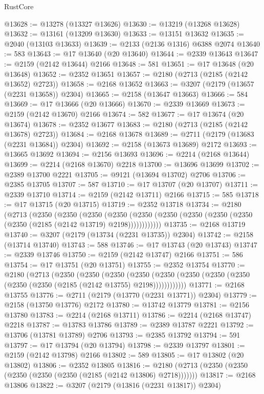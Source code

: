 \begin{lexlean}{RustCore}
\begin{coremodule}
@13628 := @13278 (@13327 @13626)
@13630 := @13219 (@13268 @13628)
@13632 := @13161 (@13209 @13630)
@13633 := @13151 @13632
@13635 := @2040 (@13103 @13633)
@13639 := @2133 (@2136 @1316) @6388 @2074
@13640 := 583
@13643 := @17 @13640 (@20 @13640)
@13644 := @2339 @13643
@13647 := @2159 (@2142 @13644) @2166
@13648 := 581
@13651 := @17 @13648 (@20 @13648)
@13652 := @2352 @13651
@13657 := @2180 (@2713 (@2185 (@2142 @13652) @2723))
@13658 := @2168 @13652
@13663 := @3207 (@2179 (@13657 (@2231 @13658)) @2304)
@13665 := @2158 (@13647 @13663)
@13666 := 584
@13669 := @17 @13666 (@20 @13666)
@13670 := @2339 @13669
@13673 := @2159 (@2142 @13670) @2166
@13674 := 582
@13677 := @17 @13674 (@20 @13674)
@13678 := @2352 @13677
@13683 := @2180 (@2713 (@2185 (@2142 @13678) @2723))
@13684 := @2168 @13678
@13689 := @2711 (@2179 (@13683 (@2231 @13684)) @2304)
@13692 := @2158 (@13673 @13689) @2172
@13693 := @13665 @13692
@13694 := @2156 @13693
@13696 := @2214 (@2168 @13644)
@13699 := @2214 (@2168 @13670) @2218
@13700 := @13696 @13699
@13702 := @2389 @13700 @2221
@13705 := @9121 (@13694 @13702) @2706
@13706 := @2385 @13705
@13707 := 587
@13710 := @17 @13707 (@20 @13707)
@13711 := @2339 @13710
@13714 := @2159 (@2142 @13711) @2166
@13715 := 585
@13718 := @17 @13715 (@20 @13715)
@13719 := @2352 @13718
@13734 := @2180
    (@2713
      (@2350
        (@2350
          (@2350
            (@2350 (@2350 (@2350 (@2350 (@2350 (@2350 (@2350 (@2185 (@2142 @13719) @2198))))))))))))
@13735 := @2168 @13719
@13740 := @3207 (@2179 (@13734 (@2231 @13735)) @2304)
@13742 := @2158 (@13714 @13740)
@13743 := 588
@13746 := @17 @13743 (@20 @13743)
@13747 := @2339 @13746
@13750 := @2159 (@2142 @13747) @2166
@13751 := 586
@13754 := @17 @13751 (@20 @13751)
@13755 := @2352 @13754
@13770 := @2180
    (@2713
      (@2350
        (@2350
          (@2350
            (@2350 (@2350 (@2350 (@2350 (@2350 (@2350 (@2350 (@2185 (@2142 @13755) @2198))))))))))))
@13771 := @2168 @13755
@13776 := @2711 (@2179 (@13770 (@2231 @13771)) @2304)
@13779 := @2158 (@13750 @13776) @2172
@13780 := @13742 @13779
@13781 := @2156 @13780
@13783 := @2214 (@2168 @13711)
@13786 := @2214 (@2168 @13747) @2218
@13787 := @13783 @13786
@13789 := @2389 @13787 @2221
@13792 := @13706 (@13781 @13789) @2706
@13793 := @2385 @13792
@13794 := 591
@13797 := @17 @13794 (@20 @13794)
@13798 := @2339 @13797
@13801 := @2159 (@2142 @13798) @2166
@13802 := 589
@13805 := @17 @13802 (@20 @13802)
@13806 := @2352 @13805
@13816 := @2180 (@2713 (@2350 (@2350 (@2350 (@2350 (@2350 (@2185 (@2142 @13806) @2718)))))))
@13817 := @2168 @13806
@13822 := @3207 (@2179 (@13816 (@2231 @13817)) @2304)

\end{coremodule}
\end{lexlean}
